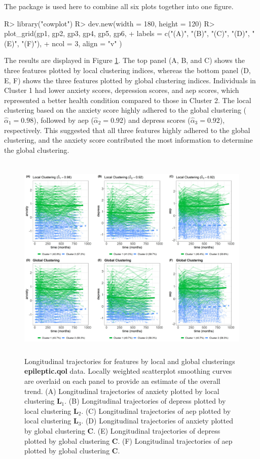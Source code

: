The  package \citep{Wilke2019} is used here to combine all six plots together into one figure. 
\begin{example}
R> library("cowplot")
R> dev.new(width = 180, height = 120)
R> plot_grid(gp1, gp2, gp3, gp4, gp5, gp6, 
+        labels = c("(A)", "(B)", "(C)", "(D)", "(E)", "(F)"), 
+        ncol = 3, align = "v" )  
\end{example}
The results are displayed in Figure \ref{fig:traj_epileptic_qol}. The top panel (A, B, and C) shows the three features plotted by local clustering indices, whereas the bottom panel (D, E, F) shows the three features plotted by global clustering indices. Individuals in Cluster 1 had lower anxiety scores, depression scores, and aep scores, which represented a better health condition compared to those in Cluster 2. The local clustering based on the anxiety score highly adhered to the global clustering ($\hat{\alpha}_1 = 0.98$), followed by aep ($\hat{\alpha}_2 = 0.92$) and depress scores ($\hat{\alpha}_3 = 0.92$), respectively. This suggested that all three features highly adhered to the global clustering, and the anxiety score contributed the most information to determine the global clustering. 
\begin{figure}[h]
\centering
\includegraphics[width=\textwidth,height=10cm]{./Figures/trajplot.JPEG}
\caption{\label{fig:traj_epileptic_qol} Longitudinal trajectories for features by local and global clusterings \textbf{epileptic.qol} data. Locally weighted scatterplot smoothing curves are overlaid on each panel to provide an estimate of the overall trend. (A) Longitudinal trajectories of anxiety plotted by local clustering $\boldsymbol{L}_1$. (B) Longitudinal trajectories of depress plotted by local clustering $\boldsymbol{L}_2$. (C) Longitudinal trajectories of aep plotted by local clustering $\boldsymbol{L}_3$. (D) Longitudinal trajectories of anxiety plotted by global clustering $\boldsymbol{C}$. (E)  Longitudinal trajectories of depress plotted by global clustering $\boldsymbol{C}$. (F)  Longitudinal trajectories of aep plotted by global clustering $\boldsymbol{C}$.}
\end{figure}
